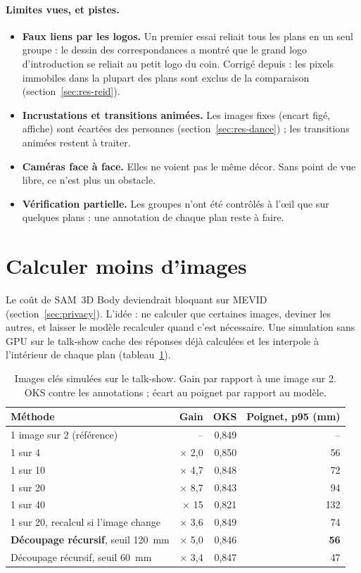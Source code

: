 \documentclass[11pt,a4paper]{report}
\begin{document}
\paragraph{Limites vues, et pistes.}
\begin{itemize}
    \item \textbf{Faux liens par les logos.} Un premier essai reliait tous les plans en un seul groupe : le dessin des correspondances
    a montré que le grand logo d'introduction se reliait au petit logo du coin. Corrigé depuis : les pixels immobiles dans la plupart
    des plans sont exclus de la comparaison (section~\ref{sec:res-reid}).
    \item \textbf{Incrustations et transitions animées.} Les images fixes (encart figé, affiche) sont écartées des personnes
    (section~\ref{sec:res-dance}) ; les transitions animées restent à traiter.
    \item \textbf{Caméras face à face.} Elles ne voient pas le même décor. Sans point de vue libre, ce n'est plus un obstacle.
    \item \textbf{Vérification partielle.} Les groupes n'ont été contrôlés à l'œil que sur quelques plans : une annotation de chaque
    plan reste à faire.
\end{itemize}

\section{Calculer moins d'images}
\label{sec:keyframes}

Le coût de SAM~3D Body deviendrait bloquant sur MEVID (section~\ref{sec:privacy}). L'idée : ne calculer que certaines images, deviner
les autres, et laisser le modèle recalculer quand c'est nécessaire. Une simulation sans GPU sur le talk-show cache des réponses déjà
calculées et les interpole à l'intérieur de chaque plan (tableau~\ref{tab:keyframes}).

\begin{table}[H]
\centering
\caption{Images clés simulées sur le talk-show. Gain par rapport à une image sur 2. OKS contre les annotations ; écart au poignet par
rapport au modèle.}
\label{tab:keyframes}
\small
\begin{tabular}{@{}lrrr@{}}
\toprule
Méthode & Gain & OKS & Poignet, p95 (mm) \\
\midrule
1 image sur 2 (référence) & -- & 0,849 & -- \\
1 sur 4 & $\times$ 2,0 & 0,850 & 56 \\
1 sur 10 & $\times$ 4,7 & 0,848 & 72 \\
1 sur 20 & $\times$ 8,7 & 0,843 & 94 \\
1 sur 40 & $\times$ 15 & 0,821 & 132 \\
1 sur 20, recalcul si l'image change & $\times$ 3,6 & 0,849 & 74 \\
\textbf{Découpage récursif}, seuil 120~mm & $\times$ 5,0 & 0,846 & \textbf{56} \\
Découpage récursif, seuil 60~mm & $\times$ 3,4 & 0,847 & 47 \\
\bottomrule
\end{tabular}
\end{table}
\end{document}
